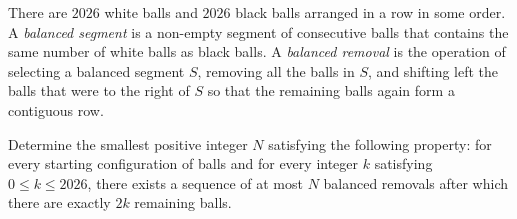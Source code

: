 There are $2026$ white balls and $2026$ black balls arranged in a row in some order.
A \emph{balanced segment} is a non-empty segment of consecutive balls that
contains the same number of white balls as black balls.
A \emph{balanced removal} is the operation of selecting a balanced segment $S$,
removing all the balls in $S$, and shifting left the balls that were to the right of $S$
so that the remaining balls again form a contiguous row.
    
Determine the smallest positive integer $N$ satisfying the following property:
for every starting configuration of balls and for every integer $k$ satisfying $0 \le k \le 2026$,
there exists a sequence of at most $N$ balanced removals
after which there are exactly $2k$ remaining balls.

